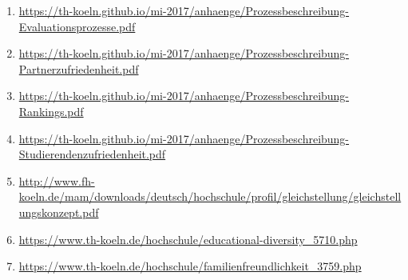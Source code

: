 \documentclass[BCOR12mm,DIV11,titlepage,a4paper,oneside,10pt]{scrbook}
\begin{document}
\begin{sloppypar}
\begin{flushleft}
\begin{enumerate}
\item{\url{https://th-koeln.github.io/mi-2017/anhaenge/Prozessbeschreibung-Evaluationsprozesse.pdf}} 
\item{\url{https://th-koeln.github.io/mi-2017/anhaenge/Prozessbeschreibung-Partnerzufriedenheit.pdf}} 
\item{\url{https://th-koeln.github.io/mi-2017/anhaenge/Prozessbeschreibung-Rankings.pdf}} 
\item{\url{https://th-koeln.github.io/mi-2017/anhaenge/Prozessbeschreibung-Studierendenzufriedenheit.pdf}} 
\item{\url{http://www.fh-koeln.de/mam/downloads/deutsch/hochschule/profil/gleichstellung/gleichstellungskonzept.pdf}} 
\item{\url{https://www.th-koeln.de/hochschule/educational-diversity\_5710.php}} 
\item{\url{https://www.th-koeln.de/hochschule/familienfreundlichkeit\_3759.php}} 

\end{enumerate}

\end{flushleft}
\end{sloppypar}

\backmatter
\end{document}
